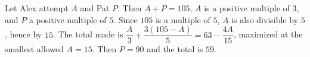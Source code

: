 Let Alex attempt $A$ and Pat $P$. Then $A+P=105$, $A$ is a positive multiple of $3$, and $P$ a positive multiple of $5$. Since $105$ is a multiple of $5$, $A$ is also divisible by $5$, hence by $15$. The total made is $\dfrac{A}{3}+\dfrac{3(105-A)}{5}=63-\dfrac{4A}{15}$, maximized at the smallest allowed $A=15$. Then $P=90$ and the total is $\boxed{59}$.
